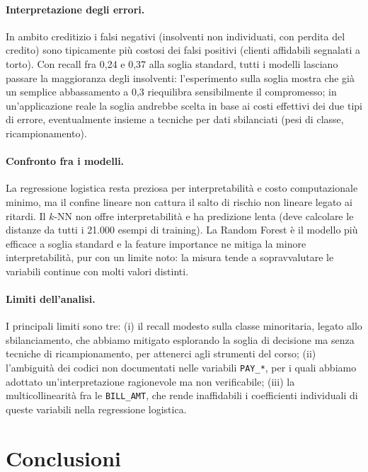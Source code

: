 \documentclass[11pt,a4paper]{article}
\begin{document}
\paragraph{Interpretazione degli errori.} In ambito creditizio i falsi negativi (insolventi non individuati, con perdita del credito) sono tipicamente pi\`u costosi dei falsi positivi (clienti affidabili segnalati a torto). Con recall fra 0,24 e 0,37 alla soglia standard, tutti i modelli lasciano passare la maggioranza degli insolventi: l'esperimento sulla soglia mostra che gi\`a un semplice abbassamento a 0,3 riequilibra sensibilmente il compromesso; in un'applicazione reale la soglia andrebbe scelta in base ai costi effettivi dei due tipi di errore, eventualmente insieme a tecniche per dati sbilanciati (pesi di classe, ricampionamento).

\paragraph{Confronto fra i modelli.} La regressione logistica resta preziosa per interpretabilit\`a e costo computazionale minimo, ma il confine lineare non cattura il salto di rischio non lineare legato ai ritardi. Il $k$-NN non offre interpretabilit\`a e ha predizione lenta (deve calcolare le distanze da tutti i 21.000 esempi di training). La Random Forest \`e il modello pi\`u efficace a soglia standard e la feature importance ne mitiga la minore interpretabilit\`a, pur con un limite noto: la misura tende a sopravvalutare le variabili continue con molti valori distinti.

\paragraph{Limiti dell'analisi.} I principali limiti sono tre: (i) il recall modesto sulla classe minoritaria, legato allo sbilanciamento, che abbiamo mitigato esplorando la soglia di decisione ma senza tecniche di ricampionamento, per attenerci agli strumenti del corso; (ii) l'ambiguit\`a dei codici non documentati nelle variabili \texttt{PAY\_*}, per i quali abbiamo adottato un'interpretazione ragionevole ma non verificabile; (iii) la multicollinearit\`a fra le \texttt{BILL\_AMT}, che rende inaffidabili i coefficienti individuali di queste variabili nella regressione logistica.

\section{Conclusioni}
\end{document}
